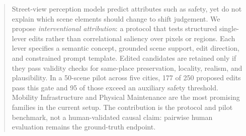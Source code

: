\begin{abstract}
Street-view perception models predict attributes such as safety, yet do
not explain which scene elements should change to shift judgement. We
propose \emph{interventional attribution}: a protocol that tests
structured single-lever edits rather than correlational saliency over
pixels or regions. Each lever specifies a semantic concept, grounded
scene support, edit direction, and constrained prompt template. Edited
candidates are retained only if they pass validity checks for same-place
preservation, locality, realism, and plausibility. In a 50-scene pilot
across five cities, 177 of 250 proposed edits pass this gate and 95 of
those exceed an auxiliary safety threshold. Mobility Infrastructure and
Physical Maintenance are the most promising families in the current
setup. The contribution is the protocol and pilot benchmark, not a
human-validated causal claim: pairwise human evaluation remains the
ground-truth endpoint.
\end{abstract}
